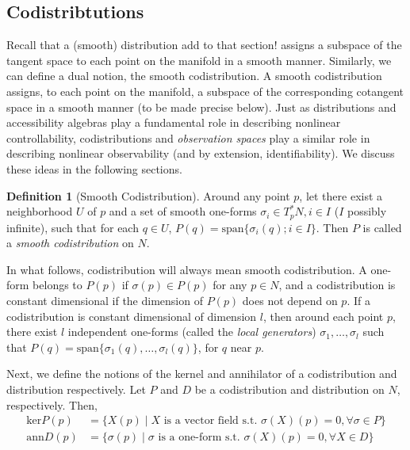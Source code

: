 \documentclass[psamsfonts]{amsart}
\theoremstyle{definition}
\newtheorem{defn}[thm]{Definition}
\theoremstyle{remark}
\numberwithin{equation}{section}
\begin{document}
\subsection{Codistribtutions}

Recall that a (smooth) distribution {\color{red}add to that section!} assigns a subspace of the tangent space to each point on the manifold in a smooth manner. Similarly, we can define a dual notion, the smooth codistribution. A smooth codistribution assigns, to each point on the manifold, a subspace of the corresponding cotangent space in a smooth manner (to be made precise below). Just as distributions and accessibility algebras play a fundamental role in describing nonlinear controllability, codistributions and \textit{observation spaces} play a similar role in describing nonlinear observability (and by extension, identifiability). We discuss these ideas in the following sections. 

\begin{defn}[Smooth Codistribution]
Around any point $p$, let there exist a neighborhood $U$ of $p$ and a set of smooth one-forms $\sigma_i \in T^*_pN, i\in I$ ($I$ possibly infinite), such that for each $q \in U$, $P(q) = \text{span}\{\sigma_i(q); i \in I\}$. Then $P$ is called a \textit{smooth codistribution }on $N$. 
\end{defn}

In what follows, codistribution will always mean smooth codistribution. A one-form belongs to $P(p)$ if $\sigma(p) \in P(p)$ for any $p\in N$, and a codistribution is constant dimensional if the dimension of $P(p)$ does not depend on $p$. If a codistribution is constant dimensional of dimension $l$, then around each point $p$, there exist $l$ independent one-forms (called the \textit{local generators}) $\sigma_1, \dots, \sigma_l$ such that $P(q) = \text{span}\{\sigma_1(q), \dots, \sigma_l(q)\}$, for $q$ near $p$. 

Next, we define the notions of the kernel and annihilator of a codistribution and distribution respectively. Let $P$ and $D$ be a codistribution and distribution on $N$, respectively. Then, 
\begin{equation}
    \begin{aligned}
        \text{ker}P(p) &={} \{X(p) \mid X \text{ is a vector field s.t. } \sigma(X)(p) = 0, \forall \sigma \in P\}\\
        \text{ann}D(p) &={} \{\sigma(p) \mid \sigma \text{ is a one-form s.t. } \sigma(X)(p) = 0, \forall X \in D\}
    \end{aligned}   
\end{equation}
\end{document}
